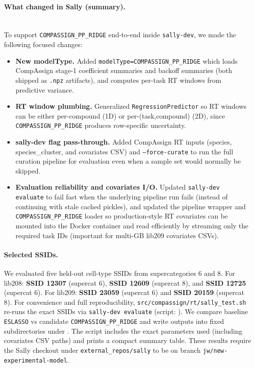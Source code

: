 \documentclass[11pt]{article}
\begin{document}
\paragraph{What changed in Sally (summary).}\mbox{}\\
To support \nolinkurl{COMPASSIGN_PP_RIDGE} end-to-end inside \texttt{sally-dev}, we made the following focused changes:
\begin{itemize}
  \item \textbf{New modelType.} Added \nolinkurl{modelType=COMPASSIGN_PP_RIDGE} which loads CompAssign stage-1 coefficient
  summaries and backoff summaries (both shipped as \texttt{.npz} artifacts), and computes per-task RT windows from
  predictive variance.
  \item \textbf{RT window plumbing.} Generalized \texttt{RegressionPredictor} so RT windows can be either per-compound
  (1D) or per-(task,compound) (2D), since \nolinkurl{COMPASSIGN_PP_RIDGE} produces row-specific uncertainty.
  \item \textbf{sally-dev flag pass-through.} Added CompAssign RT inputs (species, species\_cluster, and covariates CSV) and
  \texttt{--force-curate} to run the full curation pipeline for evaluation even when a sample set would normally be
  skipped.
  \item \textbf{Evaluation reliability and covariates I/O.} Updated \texttt{sally-dev evaluate} to fail fast when the
  underlying pipeline run fails (instead of continuing with stale cached pickles), and updated the pipeline wrapper and
  \nolinkurl{COMPASSIGN_PP_RIDGE} loader so production-style RT covariates can be mounted into the Docker container and read
  efficiently by streaming only the required task IDs (important for multi-GB lib209 covariates CSVs).
\end{itemize}

\paragraph{Selected SSIDs.}
We evaluated five held-out cell-type SSIDs from supercategories 6 and 8. For lib208:
\textbf{SSID 12307} (supercat 6), \textbf{SSID 12609} (supercat 8), and \textbf{SSID 12725} (supercat 6). For lib209:
\textbf{SSID 23059} (supercat 6) and \textbf{SSID 20159} (supercat 8).
For convenience and full reproducibility, \nolinkurl{src/compassign/rt/sally_test.sh} re-runs the exact SSIDs via
\texttt{sally-dev evaluate} (script: ).
We compare baseline \texttt{ESLASSO} vs candidate \nolinkurl{COMPASSIGN_PP_RIDGE} and write outputs into fixed
subdirectories under .
The script includes the exact parameters used (including covariates CSV paths) and prints a compact summary table.
These results require the Sally checkout under \nolinkurl{external_repos/sally} to be on branch
\nolinkurl{jw/new-experimental-model}.
\end{document}
